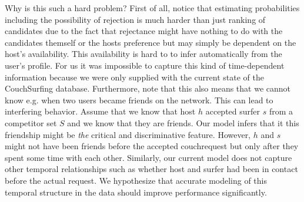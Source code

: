 Why is this such a hard problem? First of all, notice that estimating probabilities including the possibility of rejection is much harder than just ranking of candidates due to the fact that rejectance might have nothing to do with the candidates themself or the hosts preference but may simply be dependent on the host's availability. This availability is hard to to infer automatically from the user's profile. For us it was impossible to capture this kind of time-dependent information because we were only supplied with the current state of the CouchSurfing database. Furthermore, note that this also means that we cannot know e.g. when two users became friends on the network. This can lead to interfering behavior. Assume that we know that host $h$ accepted surfer $s$ from  a competitor set $S$ and we know that they are friends. Our model infers that it this friendship might be \textit{the} critical and discriminative feature. However, $h$ and $s$ might not have been friends before the accepted couchrequest but only after they spent some time with each other. Similarly, our current model does not capture other temporal relationships such as whether host and surfer had been in contact before the actual request. We hypothesize that accurate modeling of this temporal structure in the data should improve performance significantly.




